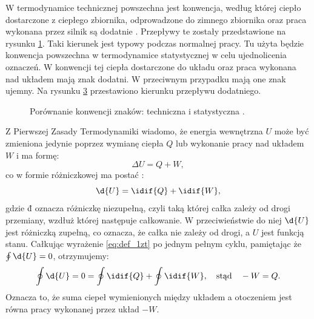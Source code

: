 W termodynamice technicznej powszechna jest konwencja, według której ciepło dostarczone z ciepłego zbiornika, odprowadzone do zimnego zbiornika oraz praca wykonana przez silnik są dodatnie \cite{b:huang_podstawy_fizyki_statystycznej}. Przepływy te zostały przedstawione na rysunku \ref{fig:konwencja_znakow_1}. Taki kierunek jest typowy podczas normalnej pracy. Tu użyta będzie konwencja powszechna w termodynamice statystycznej w celu ujednolicenia oznaczeń. W konwencji tej ciepła dostarczone do układu oraz praca wykonana nad układem mają znak dodatni. W przeciwnym przypadku mają one znak ujemny. Na rysunku \ref{fig:konwencja_znakow_2} przestawiono kierunku przepływu dodatniego.

\begin{figure}
	\centering
	\begin{subfigure}{0.45\textwidth}
		\centering
		
		\caption{}
		\label{fig:konwencja_znakow_1}
	\end{subfigure}
	\begin{subfigure}{0.45\textwidth}
		\centering
		
		\caption{}
		\label{fig:konwencja_znakow_2}
	\end{subfigure}
	\captionsetup{subrefformat=parens}
	\caption{Porównanie konwencji znaków: techniczna  i statystyczna .}
\end{figure}

Z Pierwszej Zasady Termodynamiki wiadomo, że energia wewnętrzna \(U\) może być zmieniona jedynie poprzez wymianę ciepła \(Q\) lub wykonanie pracy nad układem \(W\) i ma formę:
\begin{equation}
	\Delta U = Q + W,
\end{equation}
co w formie różniczkowej ma postać \cite{b:huang_mechanika_statystyczna}:
\begin{equation}\label{eq:def_1zt}
	\d{U} = \idif{Q} + \idif{W},
\end{equation}
gdzie \(\dbar\) oznacza różniczkę niezupełną, czyli taką której całka zależy od drogi przemiany, wzdłuż której następuje całkowanie. W przeciwieństwie do niej \(\d{U}\) jest różniczką zupełną, co oznacza, że całka nie zależy od drogi, a \(U\) jest funkcją stanu. Całkując wyrażenie \eqref{eq:def_1zt} po jednym pełnym cyklu, pamiętając że \(\oint \d{U} = 0\), otrzymujemy:
\begin{equation}\label{eq:silnik_dU0}
	\oint \d{U} = 0 = \oint \idif{Q} + \oint \idif{W}, \quad\text{stąd}\quad
	-W = Q.
\end{equation}
Oznacza to, że suma ciepeł wymienionych między układem a otoczeniem jest równa pracy wykonanej przez układ \(-W\).

